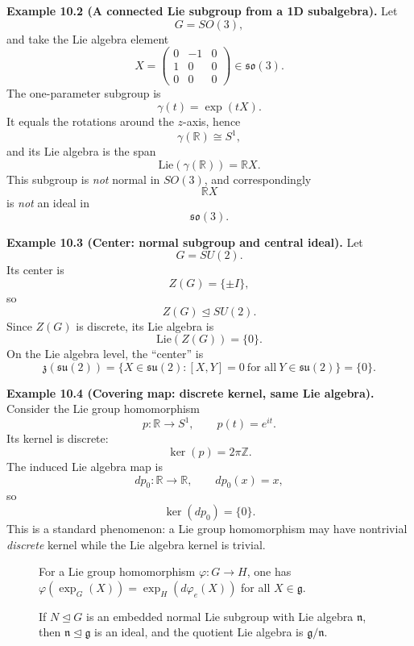 \documentclass[12pt,a4paper]{article}
\theoremstyle{plain}
\theoremstyle{definition}      %
\begin{document}
\medskip
\textbf{Example 10.2 (A connected Lie subgroup from a 1D subalgebra).}
Let
\[
G=SO(3),
\]
and take the Lie algebra element
\[
X=
\begin{pmatrix}
	0 & -1 & 0\\
	1 & 0 & 0\\
	0 & 0 & 0
\end{pmatrix}
\in
\mathfrak{so}(3).
\]
The one-parameter subgroup is
\[
\gamma(t)=\exp(tX).
\]
It equals the rotations around the $z$-axis, hence
\[
\gamma(\mathbb{R})\cong S^{1},
\]
and its Lie algebra is the span
\[
\mathrm{Lie}(\gamma(\mathbb{R}))=\mathbb{R}X.
\]
This subgroup is \emph{not} normal in $SO(3)$, and correspondingly
\[
\mathbb{R}X
\]
is \emph{not} an ideal in
\[
\mathfrak{so}(3).
\]

\medskip
\textbf{Example 10.3 (Center: normal subgroup and central ideal).}
Let
\[
G=SU(2).
\]
Its center is
\[
Z(G)=\{\pm I\},
\]
so
\[
Z(G)\trianglelefteq SU(2).
\]
Since $Z(G)$ is discrete, its Lie algebra is
\[
\mathrm{Lie}(Z(G))=\{0\}.
\]
On the Lie algebra level, the “center” is
\[
\mathfrak{z}(\mathfrak{su}(2))
=
\{X\in\mathfrak{su}(2):[X,Y]=0\ \text{for all}\ Y\in\mathfrak{su}(2)\}
=
\{0\}.
\]

\medskip
\textbf{Example 10.4 (Covering map: discrete kernel, same Lie algebra).}
Consider the Lie group homomorphism
\[
p:\mathbb{R}\to S^{1},
\qquad
p(t)=e^{it}.
\]
Its kernel is discrete:
\[
\ker(p)=2\pi\mathbb{Z}.
\]
The induced Lie algebra map is
\[
dp_{0}:\mathbb{R}\to\mathbb{R},
\qquad
dp_{0}(x)=x,
\]
so
\[
\ker(dp_{0})=\{0\}.
\]
This is a standard phenomenon:
a Lie group homomorphism may have nontrivial \emph{discrete} kernel while the Lie algebra kernel is trivial.

\bigskip

\begin{figure}[h]
	\centering
	\caption{For a Lie group homomorphism $\varphi:G\to H$, one has $\varphi(\exp_{G}(X))=\exp_{H}(d\varphi_{e}(X))$ for all $X\in\mathfrak{g}$.}
\end{figure}

\bigskip

\begin{figure}[h]
	\centering
	\caption{If $N\trianglelefteq G$ is an embedded normal Lie subgroup with Lie algebra $\mathfrak{n}$, then $\mathfrak{n}\trianglelefteq\mathfrak{g}$ is an ideal, and the quotient Lie algebra is $\mathfrak{g}/\mathfrak{n}$.}
\end{figure}
\end{document}
